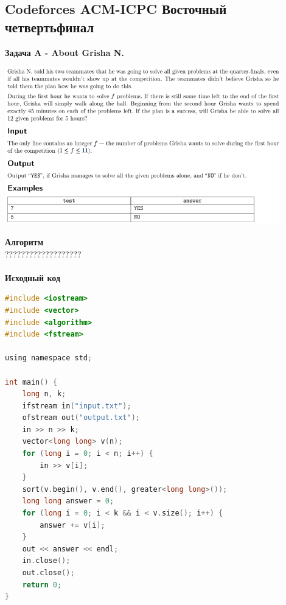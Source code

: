 \documentclass[a4paper,12pt]{article}
\begin{document}
%
%
\newpage
\subsection{Codeforces ACM-ICPC Восточный четвертьфинал}

\textbf{{\large Задача A - About Grisha N.}} \\
\begin{center}
\includegraphics[width=0.9\textwidth]{CT_ACM_EAST/CT_ACM_EAST_A.png}\\ [1cm]
\end{center}
\textbf{{\large Алгоритм}} \\
{\Huge ???????????????????} \\ 
\\
\newpage
\textbf{{\large Исходный код}}
\begin{lstlisting}[language=C]
#include <iostream>
#include <vector>
#include <algorithm>
#include <fstream>

using namespace std;

int main() {
	long n, k;
	ifstream in("input.txt");
	ofstream out("output.txt");
	in >> n >> k;
	vector<long long> v(n);
	for (long i = 0; i < n; i++) {
		in >> v[i];
	}
	sort(v.begin(), v.end(), greater<long long>());
	long long answer = 0;
	for (long i = 0; i < k && i < v.size(); i++) {
		answer += v[i];
	}
	out << answer << endl;
	in.close();
	out.close();
	return 0;
}
\end{lstlisting}
\end{document}
